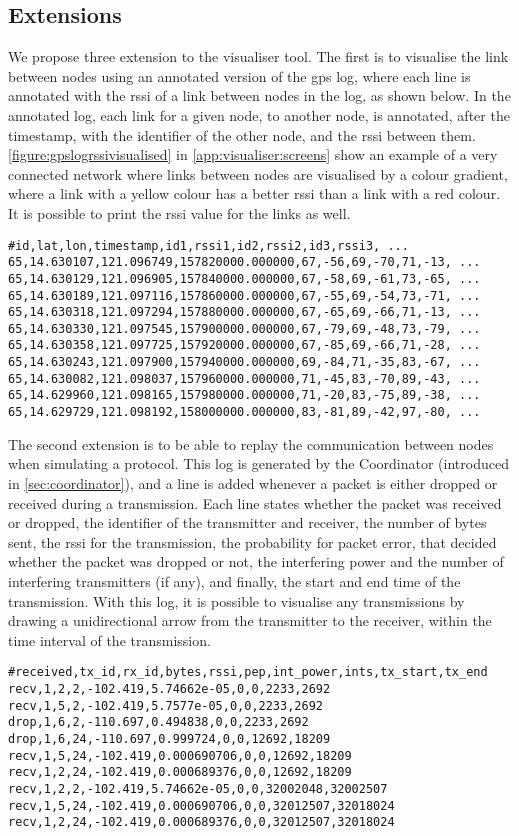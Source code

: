 \subsection{Extensions}
We propose three extension to the visualiser tool. The first is to visualise the link between nodes using an
annotated version of the \acrshort{gps} log, where each line is annotated with the \gls{rssi} of a link
between nodes in the log, as shown below. In the annotated log, each link for a given node, to another node,
is annotated, after the timestamp, with the identifier of the other node, and the \gls{rssi} between them.
\autoref{figure:gpslogrssivisualised} in \autoref{app:visualiser:screens} show an example of a very connected
network where links between nodes are visualised by a colour gradient, where a link with a yellow colour has a
better \gls{rssi} than a link with a red colour. It is possible to print the \gls{rssi} value for the links as
well.
%
\begin{verbatim}
#id,lat,lon,timestamp,id1,rssi1,id2,rssi2,id3,rssi3, ...
65,14.630107,121.096749,157820000.000000,67,-56,69,-70,71,-13, ...
65,14.630129,121.096905,157840000.000000,67,-58,69,-61,73,-65, ...
65,14.630189,121.097116,157860000.000000,67,-55,69,-54,73,-71, ...
65,14.630318,121.097294,157880000.000000,67,-65,69,-66,71,-13, ...
65,14.630330,121.097545,157900000.000000,67,-79,69,-48,73,-79, ...
65,14.630358,121.097725,157920000.000000,67,-85,69,-66,71,-28, ...
65,14.630243,121.097900,157940000.000000,69,-84,71,-35,83,-67, ...
65,14.630082,121.098037,157960000.000000,71,-45,83,-70,89,-43, ...
65,14.629960,121.098165,157980000.000000,71,-20,83,-75,89,-38, ...
65,14.629729,121.098192,158000000.000000,83,-81,89,-42,97,-80, ...
\end{verbatim}

The second extension is to be able to replay the communication between nodes when simulating a protocol. This
log is generated by the Coordinator (introduced in \autoref{sec:coordinator}), and a line is added whenever a
packet is either dropped or received during a transmission. Each line states whether the packet was received
or dropped, the identifier of the transmitter and receiver, the number of bytes sent, the \gls{rssi} for the
transmission, the probability for packet error, that decided whether the packet was dropped or not, the
interfering power and the number of interfering transmitters (if any), and finally, the start and end time of
the transmission. With this log, it is possible to visualise any transmissions by drawing a unidirectional
arrow from the transmitter to the receiver, within the time interval of the transmission.
%
\begin{verbatim}
#received,tx_id,rx_id,bytes,rssi,pep,int_power,ints,tx_start,tx_end
recv,1,2,2,-102.419,5.74662e-05,0,0,2233,2692
recv,1,5,2,-102.419,5.7577e-05,0,0,2233,2692
drop,1,6,2,-110.697,0.494838,0,0,2233,2692
drop,1,6,24,-110.697,0.999724,0,0,12692,18209
recv,1,5,24,-102.419,0.000690706,0,0,12692,18209
recv,1,2,24,-102.419,0.000689376,0,0,12692,18209
recv,1,2,2,-102.419,5.74662e-05,0,0,32002048,32002507
recv,1,5,24,-102.419,0.000690706,0,0,32012507,32018024
recv,1,2,24,-102.419,0.000689376,0,0,32012507,32018024
\end{verbatim}

